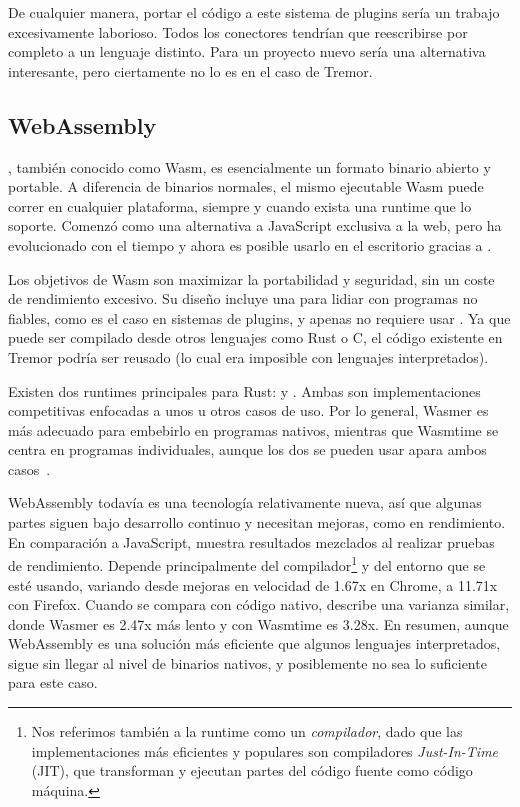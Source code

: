 De cualquier manera, portar el código a este sistema de plugins sería un trabajo
excesivamente laborioso. Todos los conectores tendrían que reescribirse por
completo a un lenguaje distinto. Para un proyecto nuevo sería una alternativa
interesante, pero ciertamente no lo es en el caso de Tremor.

\subsection{WebAssembly}

, también conocido como Wasm, es esencialmente un formato binario
abierto y portable. A diferencia de binarios normales, el mismo ejecutable Wasm
puede correr en cualquier plataforma, siempre y cuando exista una runtime que lo
soporte. Comenzó como una alternativa a JavaScript exclusiva a la web, pero ha
evolucionado con el tiempo y ahora es posible usarlo en el escritorio gracias a
.

Los objetivos de Wasm son maximizar la portabilidad y seguridad, sin un coste de
rendimiento excesivo. Su diseño incluye una \sandbox para lidiar con programas
no fiables, como es el caso en sistemas de plugins, y apenas no requiere usar
\unsafe. Ya que puede ser compilado desde otros lenguajes como Rust o C, el
código existente en Tremor podría ser reusado (lo cual era imposible con
lenguajes interpretados).

Existen dos runtimes principales para Rust:  y
. Ambas son implementaciones competitivas enfocadas a unos u
otros casos de uso. Por lo general, Wasmer es más adecuado para embebirlo en
programas nativos, mientras que Wasmtime se centra en programas individuales,
aunque los dos se pueden usar apara ambos casos~\cite{wasmwikiusage}.

WebAssembly todavía es una tecnología relativamente nueva, así que algunas
partes siguen bajo desarrollo continuo y necesitan mejoras, como en rendimiento.
En comparación a JavaScript, \textcite{jangda2019not} muestra resultados
mezclados al realizar pruebas de rendimiento. Depende principalmente del
compilador\footnote{Nos referimos también a la runtime como un
\emph{compilador}, dado que las implementaciones más eficientes y populares son
compiladores \emph{Just-In-Time} (JIT), que transforman y ejecutan partes del
código fuente como código máquina.} y del entorno que se esté usando, variando
desde mejoras en velocidad de 1.67x en Chrome, a 11.71x con Firefox. Cuando se
compara con código nativo, \textcite{libsodiumwasmperf} describe una varianza
similar, donde Wasmer es 2.47x más lento y con Wasmtime es 3.28x. En resumen,
aunque WebAssembly es una solución más eficiente que algunos lenguajes
interpretados, sigue sin llegar al nivel de binarios nativos, y posiblemente no
sea lo suficiente para este caso.

